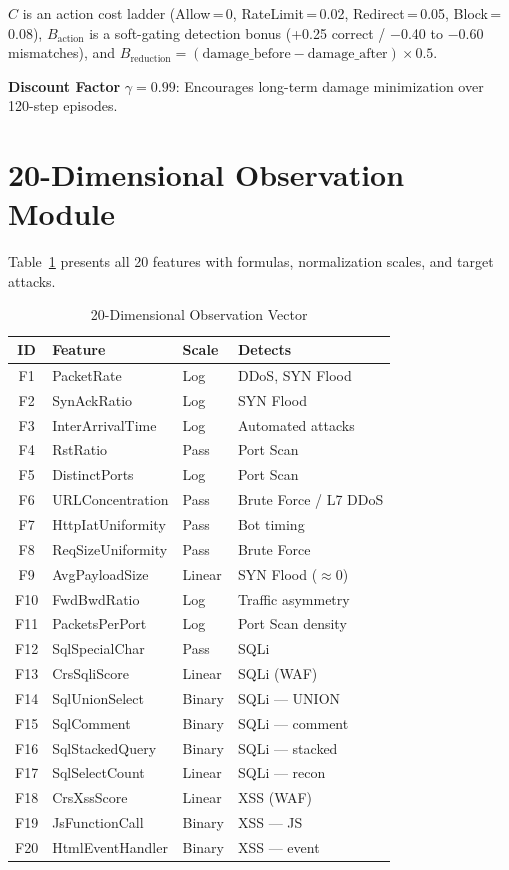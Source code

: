 \documentclass[conference]{IEEEtran}
\begin{document}
$C$ is an action cost ladder (Allow\,=\,0, RateLimit\,=\,0.02,
Redirect\,=\,0.05, Block\,=\,0.08), $B_{\text{action}}$ is a
soft-gating detection bonus (+0.25 correct / $-$0.40 to $-$0.60
mismatches), and $B_{\text{reduction}} = (\text{damage\_before} -
\text{damage\_after}) \times 0.5$.

\textbf{Discount Factor} $\gamma = 0.99$: Encourages long-term damage
minimization over 120-step episodes.

\section{20-Dimensional Observation Module}

Table~\ref{tab:features} presents all 20 features with formulas,
normalization scales, and target attacks.

\begin{table}[htbp]
\caption{20-Dimensional Observation Vector}
\label{tab:features}
\centering
\small
\begin{tabular}{clll}
\toprule
\textbf{ID} & \textbf{Feature} & \textbf{Scale} & \textbf{Detects} \\
\midrule
F1  & PacketRate          & Log    & DDoS, SYN Flood \\
F2  & SynAckRatio         & Log    & SYN Flood \\
F3  & InterArrivalTime    & Log    & Automated attacks \\
F4  & RstRatio            & Pass   & Port Scan \\
F5  & DistinctPorts       & Log    & Port Scan \\
F6  & URLConcentration    & Pass   & Brute Force / L7 DDoS \\
F7  & HttpIatUniformity   & Pass   & Bot timing \\
F8  & ReqSizeUniformity   & Pass   & Brute Force \\
F9  & AvgPayloadSize      & Linear & SYN Flood (${\approx}0$) \\
F10 & FwdBwdRatio         & Log    & Traffic asymmetry \\
F11 & PacketsPerPort      & Log    & Port Scan density \\
F12 & SqlSpecialChar      & Pass   & SQLi \\
F13 & CrsSqliScore        & Linear & SQLi (WAF) \\
F14 & SqlUnionSelect      & Binary & SQLi — UNION \\
F15 & SqlComment          & Binary & SQLi — comment \\
F16 & SqlStackedQuery     & Binary & SQLi — stacked \\
F17 & SqlSelectCount      & Linear & SQLi — recon \\
F18 & CrsXssScore         & Linear & XSS (WAF) \\
F19 & JsFunctionCall      & Binary & XSS — JS \\
F20 & HtmlEventHandler    & Binary & XSS — event \\
\bottomrule
\end{tabular}
\end{table}
\end{document}
